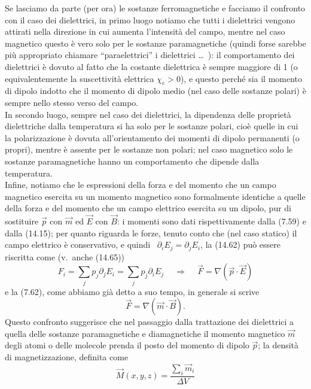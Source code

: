 Se lasciamo da parte (per ora) le sostanze ferromagnetiche e facciamo il
confronto con il caso dei dielettrici, in primo luogo notiamo che tutti i
dielettrici vengono attirati nella direzione in cui aumenta l'intensit\`a del
campo, mentre nel caso magnetico questo \`e vero solo per le sostanze
paramagnetiche (quindi forse sarebbe pi\`u appropriato chiamare
``paraelettrici'' i dielettrici \dots\ ): il comportamento dei dielettrici \`e
dovuto al fatto che la costante dielettrica \`e sempre maggiore di 1 (o
equivalentemente la suscettivit\`a elettrica $\chi_e>0$), e questo perch\'e sia
il momento di dipolo indotto che il momento di dipolo medio (nel caso delle
sostanze polari) \`e sempre nello stesso verso del campo.\\
In secondo luogo, sempre nel caso dei dielettrici, la dipendenza delle
propriet\`a dielettriche dalla temperatura si ha solo per le sostanze polari,
cio\`e quelle in cui la polarizzazione \`e dovuta all'orientamento dei momenti
di dipolo permanenti (o propri), mentre \`e assente per le sostanze non polari;
nel caso magnetico solo le sostanze paramagnetiche hanno un comportamento che
dipende dalla temperatura.\\
Infine, notiamo che le espressioni della forza e del momento che un campo
magnetico esercita su un momento magnetico sono formalmente identiche a quelle
della forza e del momento che un campo elettrico esercita su un dipolo, pur di
sostituire $\vec p$ con $\vec m$ ed
$\vec E$ con $\vec B$: i momenti sono dati rispettivamente dalla (7.59) e dalla
(14.15); per quanto riguarda le forze, tenuto conto che (nel caso statico) il
campo elettrico \`e conservativo, e quindi \ $\partial_iE_j=\partial_jE_i$, la
(14.62) pu\`o essere riscritta come \big(v.\ anche (14.65)\big)
\begin{equation}
  F_i=\textstyle\sum_jp_j\partial_jE_i=\sum_jp_j\partial_iE_j
  \quad\ \Rightarrow\quad\ \vec F=\nabla(\vec p\cdot\vec E)
  \tag{15.10}
\end{equation}
e la (7.62), come abbiamo gi\`a detto a suo tempo, in generale si scrive
\begin{equation}
  \vec F=\nabla(\vec m\cdot\vec B).
  \tag{15.11}
\end{equation}
Questo confronto suggerisce che nel passaggio dalla trattazione dei dielettrici
a quella delle sostanze paramagnetiche e diamagnetiche il momento magnetico
$\vec m$ degli atomi o delle molecole prenda il posto del momento di dipolo
$\vec p$; la densit\`a di magnetizzazione, definita come
\begin{equation}
  \vec M(x,y,z)=\frac{\sum_i\vec m_i}{\Delta V}
  \tag{15.12}
\end{equation}
